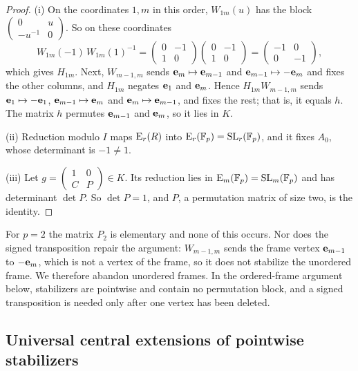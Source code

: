 \begin{proof}
(i) On the coordinates $1,m$ in this order, $W_{1m}(u)$ has the block
$\left(\begin{smallmatrix}0&u\\-u^{-1}&0\end{smallmatrix}\right)$. So on these coordinates
\[
 W_{1m}(-1)\,W_{1m}(1)^{-1}=\begin{pmatrix}0&-1\\1&0\end{pmatrix}\begin{pmatrix}0&-1\\1&0\end{pmatrix}=
 \begin{pmatrix}-1&0\\0&-1\end{pmatrix},
\]
which gives $H_{1m}$. Next,
$W_{m-1,m}$ sends $\mathbf e_m\mapsto\mathbf e_{m-1}$ and $\mathbf e_{m-1}\mapsto-\mathbf e_m$ and fixes the other columns, and
$H_{1m}$ negates $\mathbf e_1$ and $\mathbf e_m$. Hence $H_{1m}W_{m-1,m}$ sends $\mathbf e_1\mapsto-\mathbf e_1$,
$\mathbf e_{m-1}\mapsto\mathbf e_m$ and $\mathbf e_m\mapsto\mathbf e_{m-1}$, and fixes the rest; that is, it equals $h$. The matrix
$h$ permutes $\mathbf e_{m-1}$ and $\mathbf e_m$, so it lies in $K$.

(ii) Reduction modulo $I$ maps $\operatorname{E}_r(R)$ into $\operatorname{E}_r(\mathbb F_p)=\operatorname{SL}_r(\mathbb F_p)$, and it fixes $A_0$, whose determinant is
$-1\neq1$.

(iii) Let $g=\left(\begin{smallmatrix}1&0\\C&P\end{smallmatrix}\right)\in K$. Its reduction lies in
$\operatorname{E}_m(\mathbb F_p)=\operatorname{SL}_m(\mathbb F_p)$ and has determinant $\det P$. So $\det P=1$, and $P$, a permutation matrix of size two, is the
identity.
\end{proof}

For $p=2$ the matrix $P_2$ is elementary and none of this occurs. Nor does the signed transposition repair the argument:
$W_{m-1,m}$ sends the frame vertex $\mathbf e_{m-1}$ to $-\mathbf e_m$, which is not a vertex of the frame, so it does not
stabilize the unordered frame. We therefore abandon unordered frames. In the ordered-frame argument below, stabilizers
are pointwise and contain no permutation block, and a signed transposition is needed only after one vertex has been
deleted.

\subsection{Universal central extensions of pointwise stabilizers}

